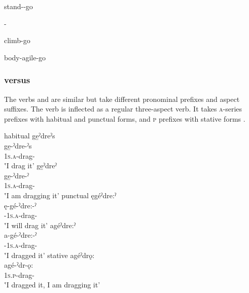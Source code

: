 \begin{multicols}{2}
 stand-{\progressive}-go  

{\stative}-{\progressive}  

 climb-go 

{\stative}  

body-agile-go   

{\stative}  



\end{multicols}

\subsubsection*{   versus  }
The verbs   and   are similar but take different pronominal prefixes and aspect suffixes. The verb   is inflected as a regular three-aspect verb. It takes \textsc{a}-series prefixes with habitual and punctual forms, and \textsc{p} prefixes with stative forms .


\ea\label{ex:dragex}   
\ea habitual
\ea ge̱ˀdreˀs \\
\gll ge̱-ˀdre-ˀs\\
\textsc{1s.a}-drag-{\habitual}\\
\glt ‛I drag it'
\ex ge̱ˀdreˀ \\
\gll ge̱-ˀdre-ˀ\\
\textsc{1s.a}-drag-{\habitual}\\
\glt ‛I am dragging it' 
\z
\ex punctual
\ea ęgéˀdre:ˀ\\
\gll ę-gé-ˀdre:-ˀ \\
 \textsc{{\future}-1s.a}-drag-{\punctual}\\
\glt ‛I will drag it'
\ex agéˀdre:ˀ\\
\gll a-gé-ˀdre:-ˀ \\
\textsc{{\factual}-1s.a}-drag-{\punctual}\\
\glt ‛I dragged it' 
\z
\ex stative
\ea agéˀdrǫ: \\
\gll agé-ˀdr-ǫ: \\
\textsc{1s.p}-drag-{\stative}\\
\glt ‛I dragged it, I am dragging it'
\z
\z
\z

